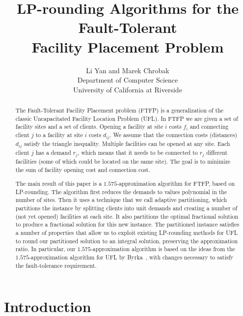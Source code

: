 \documentclass[11pt]{article}
\title{LP-rounding Algorithms for the Fault-Tolerant\\
 		Facility Placement Problem}
\author{Li Yan and Marek Chrobak\\
  Department of Computer Science\\
 University of California at Riverside}
\date{}
\begin{document}
\maketitle

\thispagestyle{empty}
\begin{abstract} 
  The Fault-Tolerant Facility Placement problem (FTFP) is a
  generalization of the classic Uncapacitated Facility
  Location Problem (UFL). In FTFP we are given a set of
  facility sites and a set of clients. Opening a facility at
  site $i$ costs $f_i$ and connecting client $j$ to a
  facility at site $i$ costs $d_{ij}$. We assume that the
  connection costs (distances) $d_{ij}$ satisfy the triangle
  inequality. Multiple facilities can be opened at any
  site. Each client $j$ has a demand $r_j$, which means that
  it needs to be connected to $r_j$ different facilities
  (some of which could be located on the same site). The
  goal is to minimize the sum of facility opening cost and
  connection cost.

  The main result of this paper is a $1.575$-approximation
  algorithm for FTFP, based on LP-rounding. The algorithm
  first reduces the demands to values polynomial in the
  number of sites. Then it uses a technique that we
  call adaptive partitioning, which partitions the instance
  by splitting clients into unit demands and creating a
  number of (not yet opened) facilities at each site. It
  also partitions the optimal fractional solution to produce
  a fractional solution for this new instance.  The
  partitioned instance satisfies a number of properties that
  allow us to exploit existing LP-rounding methods for UFL to
  round our partitioned solution to an integral
  solution, preserving the approximation ratio.  In
  particular, our $1.575$-approximation algorithm is based
  on the ideas from the $1.575$-approximation algorithm for
  UFL by Byrka~\etal, with changes necessary to satisfy
  the fault-tolerance requirement.
\end{abstract}

\pagebreak
\setcounter{page}{1}

\section{Introduction}
\end{document}
